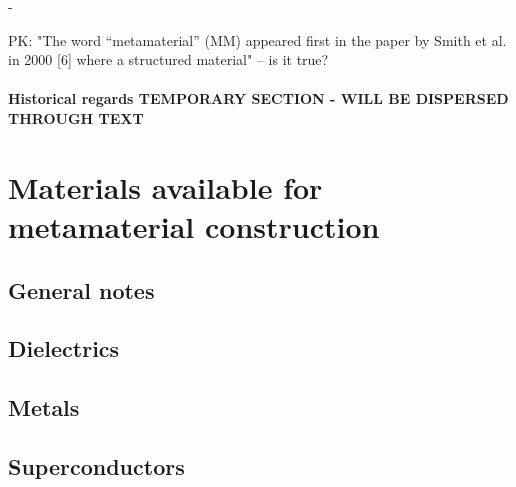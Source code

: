 -


PK: "The word “metamaterial” (MM) appeared first in the paper by Smith et al. in 2000 [6] where a structured material" -- is it true?




\paragraph{Historical regards TEMPORARY SECTION - WILL BE DISPERSED THROUGH TEXT}





\section{Materials available for metamaterial construction}
\subsection{General notes}
\subsection{Dielectrics}
\subsection{Metals}
\subsection{Superconductors}
